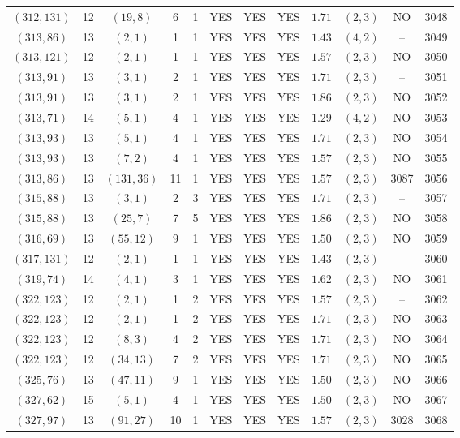 \begin{longtable}{|c|c|c|c|c|c|c|c|c|c|c|c|}
$(312,131)$ & 12 & $(19,8)$ & 6 & 1 & YES & YES & YES & $1.71$ & $(2,3)$ & NO & 3048\\
$(313,86)$ & 13 & $(2,1)$ & 1 & 1 & YES & YES & YES & $1.43$ & $(4,2)$ & -- & 3049\\
$(313,121)$ & 12 & $(2,1)$ & 1 & 1 & YES & YES & YES & $1.57$ & $(2,3)$ & NO & 3050\\
$(313,91)$ & 13 & $(3,1)$ & 2 & 1 & YES & YES & YES & $1.71$ & $(2,3)$ & -- & 3051\\
$(313,91)$ & 13 & $(3,1)$ & 2 & 1 & YES & YES & YES & $1.86$ & $(2,3)$ & NO & 3052\\
$(313,71)$ & 14 & $(5,1)$ & 4 & 1 & YES & YES & YES & $1.29$ & $(4,2)$ & NO & 3053\\
$(313,93)$ & 13 & $(5,1)$ & 4 & 1 & YES & YES & YES & $1.71$ & $(2,3)$ & NO & 3054\\
$(313,93)$ & 13 & $(7,2)$ & 4 & 1 & YES & YES & YES & $1.57$ & $(2,3)$ & NO & 3055\\
$(313,86)$ & 13 & $(131,36)$ & 11 & 1 & YES & YES & YES & $1.57$ & $(2,3)$ & 3087 & 3056\\
$(315,88)$ & 13 & $(3,1)$ & 2 & 3 & YES & YES & YES & $1.71$ & $(2,3)$ & -- & 3057\\
$(315,88)$ & 13 & $(25,7)$ & 7 & 5 & YES & YES & YES & $1.86$ & $(2,3)$ & NO & 3058\\
$(316,69)$ & 13 & $(55,12)$ & 9 & 1 & YES & YES & YES & $1.50$ & $(2,3)$ & NO & 3059\\
$(317,131)$ & 12 & $(2,1)$ & 1 & 1 & YES & YES & YES & $1.43$ & $(2,3)$ & -- & 3060\\
$(319,74)$ & 14 & $(4,1)$ & 3 & 1 & YES & YES & YES & $1.62$ & $(2,3)$ & NO & 3061\\
$(322,123)$ & 12 & $(2,1)$ & 1 & 2 & YES & YES & YES & $1.57$ & $(2,3)$ & -- & 3062\\
$(322,123)$ & 12 & $(2,1)$ & 1 & 2 & YES & YES & YES & $1.71$ & $(2,3)$ & NO & 3063\\
$(322,123)$ & 12 & $(8,3)$ & 4 & 2 & YES & YES & YES & $1.71$ & $(2,3)$ & NO & 3064\\
$(322,123)$ & 12 & $(34,13)$ & 7 & 2 & YES & YES & YES & $1.71$ & $(2,3)$ & NO & 3065\\
$(325,76)$ & 13 & $(47,11)$ & 9 & 1 & YES & YES & YES & $1.50$ & $(2,3)$ & NO & 3066\\
$(327,62)$ & 15 & $(5,1)$ & 4 & 1 & YES & YES & YES & $1.50$ & $(2,3)$ & NO & 3067\\
$(327,97)$ & 13 & $(91,27)$ & 10 & 1 & YES & YES & YES & $1.57$ & $(2,3)$ & 3028 & 3068\\

\end{longtable}
